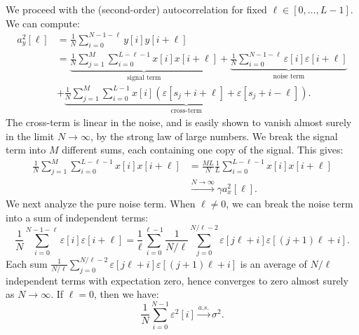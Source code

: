 \documentclass[12pt]{article}
\newcommand{\1}{\mathbf{1}}
\theoremstyle{plain}
\theoremstyle{definition}
\theoremstyle{remark}
\theoremstyle{plain}
\theoremstyle{remark}
\theoremstyle{plain}
\theoremstyle{plain}
\begin{document}
We proceed with the (second-order) autocorrelation for fixed $\ell\in[0,\ldots,L-1]$. We can compute:
%
\begin{align*}
%
a_y^2[\ell] & = \frac{1}{N}\sum_{i=0}^{N-1-\ell}y[i]y[i+\ell]
\nonumber \\
& = \underbrace{\frac{1}{N}\sum_{j=1}^{M}\sum_{i=0}^{L-\ell-1}x[i]x[i+\ell]}_{\text{signal term}} + \underbrace{\frac{1}{N}\sum_{i=0}^{N-1-\ell}\varepsilon[i]\varepsilon[i+\ell]}_{\text{noise term}}
\\ & + \underbrace{\frac{1}{N} \sum_{j=1}^{M} \sum_{i=0}^{L-1} x[i] (\varepsilon[s_j + i + \ell] + \varepsilon[s_j + i - \ell])}_{\text{cross-term}}. 
%
\end{align*}
The cross-term is linear in the noise, and is easily shown to vanish almost surely in the limit $N\to\infty$, by the strong law of large numbers. We break the signal term into $M$ different sums, each containing one copy of the signal. This gives:
%
\begin{align} \label{eq:2nd_moment_signal_term}
%
\frac{1}{N}\sum_{j=1}^{M}\sum_{i=0}^{L-\ell-1}x[i]x[i+\ell] & = \frac{ML}{N}\frac{1}{L}\sum_{i=0}^{L-\ell-1}x[i]x[i+\ell]\nonumber\\&\xrightarrow{N\to\infty}\gamma a_x^2[\ell].
%
\end{align}
%
We next analyze the pure noise term. When $\ell\neq 0$, we can break the noise term into a sum of independent terms:
%
\begin{equation*}
%
\frac{1}{N}\sum_{i=0}^{N-1-\ell} \varepsilon[i]\varepsilon[i+\ell] = \frac{1}{\ell}\sum_{i=0}^{\ell-1}\frac{1}{N/\ell}\sum_{j=0}^{N/\ell -2} \varepsilon[j\ell + i] \varepsilon[(j+1)\ell + i].
%
\end{equation*}
%
Each sum $\frac{1}{N/\ell}\sum_{j=0}^{N/\ell -2} \varepsilon[j\ell + i] \varepsilon[(j+1)\ell + i]$ is an average of $N/\ell$ independent terms with expectation zero, hence converges to zero almost surely as $N\to\infty$. If $\ell=0$, then we have:
%
\begin{equation*}
\frac{1}{N}\sum_{i=0}^{N-1} \varepsilon^2[i] \xrightarrow{a.s.} \sigma^2.
\end{equation*}
\end{document}
